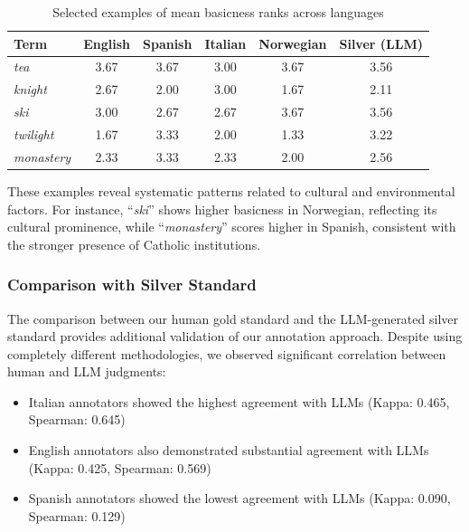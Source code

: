 \documentclass[preprint,12pt,authoryear]{elsarticle}
\begin{document}
\begin{table}[h]
\centering
\caption{Selected examples of mean basicness ranks across languages}
\label{tab:cross_ling_patterns}
\begin{tabular}{lccccc}
\toprule
\textbf{Term} & \textbf{English} & \textbf{Spanish} & \textbf{Italian} & \textbf{Norwegian} & \textbf{Silver (LLM)} \\
\midrule
\textit{tea} & \cellcolor{gray!71} 3.67 & \cellcolor{gray!71} 3.67 & \cellcolor{gray!60} 3.00 & \cellcolor{gray!71} 3.67 & \cellcolor{gray!69} 3.56 \\
\textit{knight} & \cellcolor{gray!53} 2.67 & \cellcolor{gray!40} 2.00 & \cellcolor{gray!60} 3.00 & \cellcolor{gray!27} 1.67 & \cellcolor{gray!37} 2.11 \\
\textit{ski} & \cellcolor{gray!60} 3.00 & \cellcolor{gray!53} 2.67 & \cellcolor{gray!53} 2.67 & \cellcolor{gray!71} 3.67 & \cellcolor{gray!69} 3.56 \\
\textit{twilight} & \cellcolor{gray!27} 1.67 & \cellcolor{gray!66} 3.33 & \cellcolor{gray!40} 2.00 & \cellcolor{gray!13} 1.33 & \cellcolor{gray!66} 3.22 \\
\textit{monastery} & \cellcolor{gray!47} 2.33 & \cellcolor{gray!66} 3.33 & \cellcolor{gray!47} 2.33 & \cellcolor{gray!33} 2.00 & \cellcolor{gray!53} 2.56 \\
\bottomrule
\end{tabular}
\end{table}

These examples reveal systematic patterns related to cultural and environmental factors. For instance, ``\textit{ski}'' shows higher basicness in Norwegian, reflecting its cultural prominence, while ``\textit{monastery}'' scores higher in Spanish, consistent with the stronger presence of Catholic institutions.

\subsubsection{Comparison with Silver Standard}

The comparison between our human gold standard and the LLM-generated silver standard provides additional validation of our annotation approach. Despite using completely different methodologies, we observed significant correlation between human and LLM judgments:

\begin{itemize}
\item Italian annotators showed the highest agreement with LLMs (Kappa: 0.465, Spearman: 0.645)
\item English annotators also demonstrated substantial agreement with LLMs (Kappa: 0.425, Spearman: 0.569)
\item Spanish annotators showed the lowest agreement with LLMs (Kappa: 0.090, Spearman: 0.129)
\end{itemize}
\end{document}
